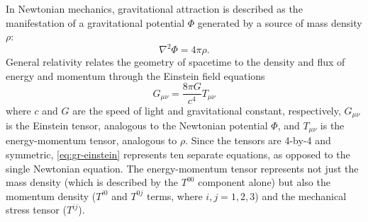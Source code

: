 In Newtonian mechanics, gravitational attraction is described as the manifestation of a gravitational potential $\Phi$ generated by a source of mass density $\rho$:
\begin{equation}
	\nabla^2 \Phi = 4\pi\rho.
\end{equation}
General relativity relates the geometry of spacetime to the density and flux of energy and momentum through the Einstein field equations
\begin{equation}\label{eq:gr-einstein}
	G_{\mu\nu} = \frac{8\pi G}{c^4} T_{\mu\nu}
\end{equation}
where $c$ and $G$ are the speed of light and gravitational constant, respectively, $G_{\mu\nu}$ is the Einstein tensor, analogous to the Newtonian potential $\Phi$, and $T_{\mu\nu}$ is the energy-momentum tensor, analogous to $\rho$.
Since the tensors are 4-by-4 and symmetric, \cref{eq:gr-einstein} represents ten separate equations, as opposed to the single Newtonian equation.
The energy-momentum tensor represents not just the mass density (which is described by the $T^{00}$ component alone) but also the momentum density ($T^{i0}$ and $T^{0j}$ terms, where $i,j = 1, 2, 3$) and the mechanical stress tensor ($T^{ij}$).

